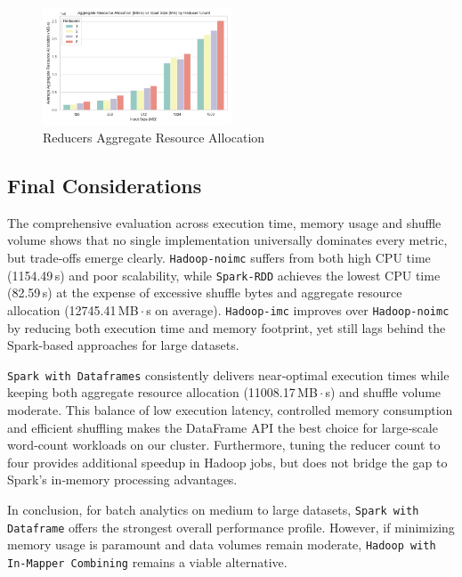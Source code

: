 \begin{figure}[H]
	\centering
	\includegraphics[width=0.5\textwidth]{images/Fig_Reducers_Aggregate_Resource_Allocation.png}
	\caption{Reducers Aggregate Resource Allocation}
	\label{fig:reducer-aggregate-resource-allocation}
\end{figure}

\subsection{Final Considerations}
The comprehensive evaluation across execution time, memory usage and shuffle volume shows that no single implementation universally dominates every metric, but trade‑offs emerge clearly. \texttt{Hadoop-noimc} suffers from both high CPU time (1154.49\,s) and poor scalability, while \texttt{Spark-RDD} achieves the lowest CPU time (82.59\,s) at the expense of excessive shuffle bytes and aggregate resource allocation (12745.41\,MB\,$\cdot$\,s on average). \texttt{Hadoop-imc} improves over \texttt{Hadoop-noimc} by reducing both execution time and memory footprint, yet still lags behind the Spark-based approaches for large datasets.

\texttt{Spark with Dataframes} consistently delivers near‑optimal execution times while keeping both aggregate resource allocation (11008.17\,MB\,$\cdot$\,s) and shuffle volume moderate. This balance of low execution latency, controlled memory consumption and efficient shuffling makes the DataFrame API the best choice for large‑scale word‑count workloads on our cluster. Furthermore, tuning the reducer count to four provides additional speedup in Hadoop jobs, but does not bridge the gap to Spark’s in‑memory processing advantages.

In conclusion, for batch analytics on medium to large datasets, \texttt{Spark with Dataframe} offers the strongest overall performance profile. However, if minimizing memory usage is paramount and data volumes remain moderate, \texttt{Hadoop with In-Mapper Combining} remains a viable alternative.
